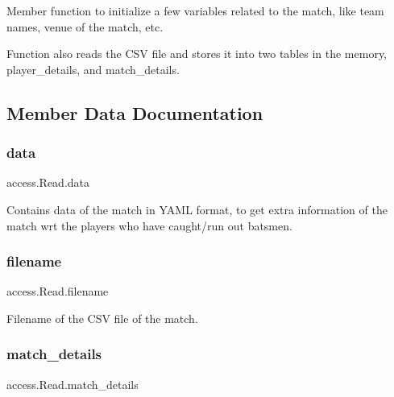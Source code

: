 Member function to initialize a few variables related to the match, like team names, venue of the match, etc. 

Function also reads the C\+SV file and stores it into two tables in the memory, player\+\_\+details, and match\+\_\+details. 

\subsection{Member Data Documentation}
\mbox{\label{classaccess_1_1Read_a5a7dbfc250ef34435c08e175135c7c90}} 
\subsubsection{\texorpdfstring{data}{data}}
{\footnotesize\ttfamily access.\+Read.\+data}



Contains data of the match in Y\+A\+ML format, to get extra information of the match wrt the players who have caught/run out batsmen. 

\mbox{\label{classaccess_1_1Read_afc80365a54bec281993b7a257080b029}} 
\subsubsection{\texorpdfstring{filename}{filename}}
{\footnotesize\ttfamily access.\+Read.\+filename}



Filename of the C\+SV file of the match. 

\mbox{\label{classaccess_1_1Read_afb6b007e7b4888e71b0aedc00e92708d}} 
\subsubsection{\texorpdfstring{match\+\_\+details}{match\_details}}
{\footnotesize\ttfamily access.\+Read.\+match\+\_\+details}



